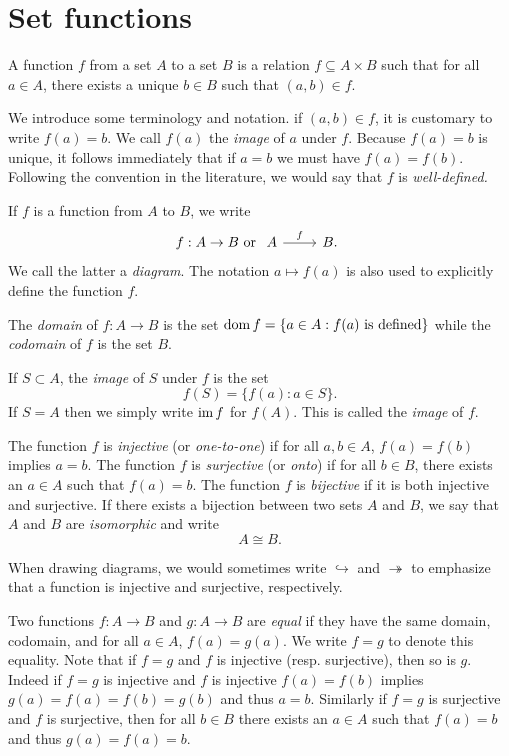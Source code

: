 \section{Set functions}
\label{sec:set-functions}

\begin{definition}
    A function \(f\) from a set \(A\) to a set \(B\) is a relation \(f \subseteq
    A \times B\) such that for all \(a \in A\), there exists a unique \(b \in
    B\) such that \((a, b) \in f\).
\end{definition}

We introduce some terminology and notation. if \((a, b) \in f\), it is
customary to write \(f(a) = b\). We call \(f(a)\) the \emph{image} of \(a\)
under \(f\). Because \(f(a) = b\) is unique, it follows immediately that if
\(a = b\) we must have \(f(a) = f(b)\). Following the convention in the
literature, we would say that \(f\) is \emph{well-defined.}

If \(f\) is a function from \(A\) to \(B\), we write
\[
    f: A \to B \text{ or } \begin{tikzcd}
        A \arrow[r, "f"] & B.
    \end{tikzcd}
\]
We call the latter a \emph{diagram}. The notation \(a \mapsto f(a)\) is also
used to explicitly define the function \(f\).

The \emph{domain} of \(f : A \to B\) is the set \(\operatorname{dom} f = \{a \in A : f(a)
\text{ is defined}\}\) while the \emph{codomain} of \(f\) is the set \(B\). 

If \(S \subset A\), the \emph{image} of \(S\) under \(f\) is the set
\[
    f(S) = \{f(a) : a \in S\}.
\]
If \(S = A\) then we simply write \(\operatorname{im} f\) for \(f(A)\). This is called
the \emph{image} of \(f\).


The function \(f\) is \emph{injective} (or \emph{one-to-one}) if for all \(a, b
\in A\), \(f(a) = f(b)\) implies \(a = b\). The function \(f\) is
\emph{surjective} (or \emph{onto}) if for all \(b \in B\), there exists an \(a
\in A\) such that \(f(a) = b\). The function \(f\) is \emph{bijective} if it is
both injective and surjective. If there exists a bijection between two sets
\(A\) and \(B\), we say that \(A\) and \(B\) are \emph{isomorphic} and write
\[
    A \cong B.
\]

When drawing diagrams, we would sometimes write \(\hookrightarrow\) and
\(\twoheadrightarrow\) to emphasize that a function is injective and surjective,
respectively.

Two functions \(f: A \to B\) and \(g: A \to B\) are \emph{equal} if they have
the same domain, codomain, and for all \(a \in A\), \(f(a) = g(a)\). We write
\(f = g\) to denote this equality. Note that if \(f = g\) and \(f\) is injective
(resp. surjective), then so is \(g\). Indeed if \(f = g\) is injective and \(f\)
is injective \(f(a) = f(b)\) implies \(g(a) = f(a) = f(b) = g(b)\) and thus \(a
= b\). Similarly if \(f = g\) is surjective and \(f\) is surjective, then for
all \(b \in B\) there exists an \(a \in A\) such that \(f(a) = b\) and thus
\(g(a) = f(a) = b\).

